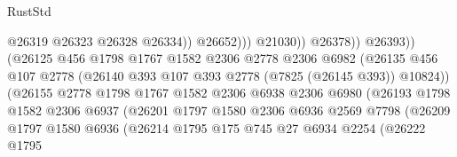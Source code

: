 \begin{lexlean}{RustStd}
\begin{coremodule}
                                                      @26319
                                                      @26323
                                                      @26328
                                                      @26334))
                                                  @26652)))
                                            @21030))
                                        @26378))
                                    @26393))
                                (@26125
                                  @456
                                  @1798
                                  @1767
                                  @1582
                                  @2306
                                  @2778
                                  @2306
                                  @6982
                                  (@26135
                                    @456
                                    @107
                                    @2778
                                    (@26140 @393 @107 @393 @2778 (@7825 (@26145 @393)) @10824))
                                  (@26155
                                    @2778
                                    @1798
                                    @1767
                                    @1582
                                    @2306
                                    @6938
                                    @2306
                                    @6980
                                    (@26193
                                      @1798
                                      @1582
                                      @2306
                                      @6937
                                      (@26201
                                        @1797
                                        @1580
                                        @2306
                                        @6936
                                        @2569
                                        @7798
                                        (@26209
                                          @1797
                                          @1580
                                          @6936
                                          (@26214
                                            @1795
                                            @175
                                            @745
                                            @27
                                            @6934
                                            @2254
                                            (@26222
                                              @1795

\end{coremodule}
\end{lexlean}
